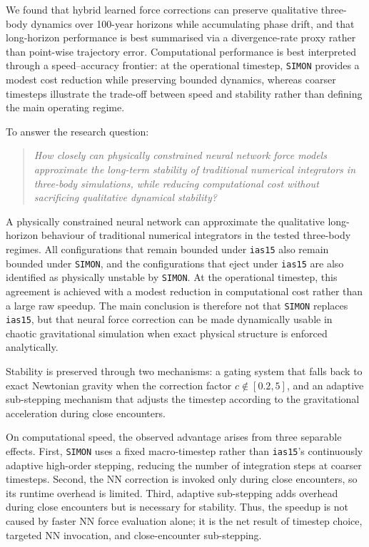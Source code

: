 \documentclass[12pt]{article}
\begin{document}
We found that hybrid learned force corrections can preserve qualitative three-body dynamics over 100-year horizons while accumulating phase drift, and that long-horizon performance is best summarised via a divergence-rate proxy rather than point-wise trajectory error. Computational performance is best interpreted through a speed--accuracy frontier: at the operational timestep, \texttt{SIMON} provides a modest cost reduction while preserving bounded dynamics, whereas coarser timesteps illustrate the trade-off between speed and stability rather than defining the main operating regime.

To answer the research question:
\begin{quote}
\emph{How closely can physically constrained neural network force models approximate the long-term stability of traditional numerical integrators in three-body simulations, while reducing computational cost without sacrificing qualitative dynamical stability?}
\end{quote}

\noindent A physically constrained neural network can approximate the qualitative long-horizon behaviour of traditional numerical integrators in the tested three-body regimes. All configurations that remain bounded under \texttt{ias15} also remain bounded under \texttt{SIMON}, and the configurations that eject under \texttt{ias15} are also identified as physically unstable by \texttt{SIMON}. At the operational timestep, this agreement is achieved with a modest reduction in computational cost rather than a large raw speedup. The main conclusion is therefore not that \texttt{SIMON} replaces \texttt{ias15}, but that neural force correction can be made dynamically usable in chaotic gravitational simulation when exact physical structure is enforced analytically.

Stability is preserved through two mechanisms: a gating system that falls back to exact Newtonian gravity when the correction factor $c \notin [0.2, 5]$, and an adaptive sub-stepping mechanism that adjusts the timestep according to the gravitational acceleration during close encounters.

On computational speed, the observed advantage arises from three separable effects. First, \texttt{SIMON} uses a fixed macro-timestep rather than \texttt{ias15}'s continuously adaptive high-order stepping, reducing the number of integration steps at coarser timesteps. Second, the NN correction is invoked only during close encounters, so its runtime overhead is limited. Third, adaptive sub-stepping adds overhead during close encounters but is necessary for stability. Thus, the speedup is not caused by faster NN force evaluation alone; it is the net result of timestep choice, targeted NN invocation, and close-encounter sub-stepping.
\end{document}
